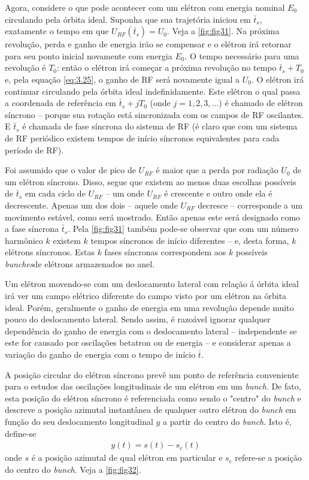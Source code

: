 Agora, considere o que pode acontecer com um elétron com energia nominal $E_0$ circulando pela órbita ideal. Suponha que sua trajetória iniciou em $\bar{t}_s$, exatamente o tempo em que $U_{RF}(\bar{t}_s) = U_0$. Veja a \autoref{fig:fig31}. Na próxima revolução, perda e ganho de energia irão se compensar e o elétron irá retornar para seu ponto inicial novamente com energia $E_0$. O tempo necessário para uma revolução é $T_0$: então o elétron irá começar a próxima revolução no tempo $\bar{t}_s + T_0$ e, pela equação \eqref{eq:3.25}, o ganho de RF será novamente igual a $U_0$. O elétron irá continuar circulando pela órbita ideal indefinidamente. Este elétron o qual passa a coordenada de referência em $\bar{t}_s+jT_0$ (onde $j=1,2,3,...$) é chamado de elétron síncrono -- porque sua rotação está sincronizada com os campos de RF oscilantes. E $\bar{t}_s$ é chamada de fase síncrona do sistema de RF (é claro que com um sistema de RF periódico existem tempos de início síncronos equivalentes para cada período de RF).

Foi assumido que o valor de pico de $U_{RF}$ é maior que a perda por radiação $U_0$ de um elétron síncrono. Disso, segue que existem ao menos duas escolhas possíveis de $\bar{t}_s$ em cada ciclo de $U_{RF}$ -- um onde $U_{RF}$ é crescente e outro onde ela é decrescente. Apenas um dos dois -- aquele onde $U_{RF}$ decresce -- corresponde a um movimento estável, como será mostrado. Então apenas este será designado como a fase síncrona $\bar{t}_s$. Pela \autoref{fig:fig31} também pode-se observar que com um número harmônico $k$ existem $k$ tempos síncronos de início diferentes -- e, desta forma, $k$ elétrons síncronos. Estas $k$ fases síncronas correspondem aos $k$ possíveis \textit{bunches}de elétrons armazenados no anel.

Um elétron movendo-se com um deslocamento lateral com relação á órbita ideal irá ver um campo elétrico diferente do campo visto por um elétron na órbita ideal. Porém, geralmente o ganho de energia em uma revolução depende muito pouco do deslocamento lateral. Sendo assim, é razoável ignorar qualquer dependência do ganho de energia com o deslocamento lateral -- independente se este for causado por oscilações betatron ou de energia -- e considerar apenas a variação do ganho de energia com o tempo de início $\bar{t}$.

A posição circular do elétron síncrono prevê um ponto de referência conveniente para o estudos das oscilações longitudinais de um elétron em um \textit{bunch}. De fato, esta posição  do elétron síncrono é referenciada como sendo o "centro"  do \textit{bunch} e descreve a posição azimutal instantânea de qualquer outro elétron do \textit{bunch} em função do seu deslocamento longitudinal $y$ a partir do centro do \textit{bunch}. Isto é, define-se
\begin{align}
	y(t) = s(t) - s_c(t)
\end{align}
onde $s$ é a posição azimutal de qual elétron em particular e $s_c$ refere-se a posição do centro do \textit{bunch}. Veja a \autoref{fig:fig32}.

